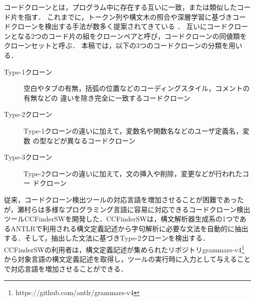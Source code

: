 \documentclass[T,J]{fose}
\begin{document}
コードクローンとは，プログラム中に存在する互いに一致，または類似したコード片を指す\cite{コードクローン検出法}．
これまでに，トークン列や構文木の照合や深層学習に基づきコードクローンを検出する手法が数多く提案されてきている \cite{DECKARD,CCFinder,クローンタイプ,CCFinderSW,astnn}．
互いにコードクローンとなる2つのコード片の組をクローンペアと呼び，コードクローンの同値類をクローンセットと呼ぶ．
本稿では，以下の3つのコードクローンの分類を用いる\cite{クローンタイプ}．
\begin{description}
    \item[Type-1クローン] 空白やタブの有無，括弧の位置などのコーディングスタイル，コメントの有無などの
違いを除き完全に一致するコードクローン
    \item[Type-2クローン] Type-1クローンの違いに加えて，変数名や関数名などのユーザ定義名，変数
の型などが異なるコードクローン
    \item[Type-3クローン] Type-2クローンの違いに加えて，文の挿入や削除，変更などが行われたコー
ドクローン
\end{description}




従来，コードクローン検出ツールの対応言語を増加させることが困難であったが，瀬村らは多様なプログラミング言語に容易に対応できるコードクローン検出ツールCCFinderSWを開発した\cite{CCFinderSW}．CCFinderSWは，構文解析器生成系の1つであるANTLRで利用される構文定義記述から字句解析に必要な文法を自動的に抽出する．そして，抽出した文法に基づきType-2クローンを検出する．
CCFinderSWの利用者は，構文定義記述が集められたリポジトリgrammars-v4\footnote{https://github.com/antlr/grammars-v4}から対象言語の構文定義記述を取得し，ツールの実行時に入力として与えることで対応言語を増加させることができる．
\end{document}
